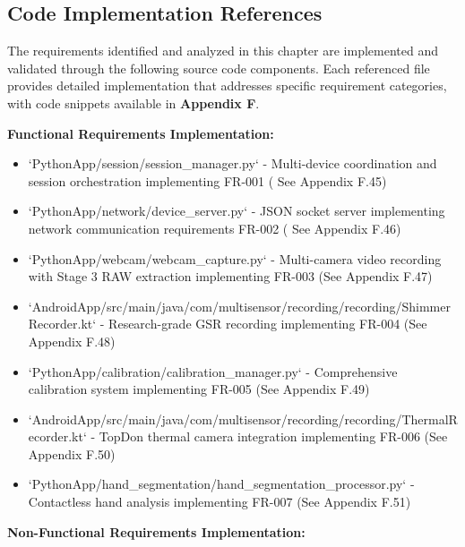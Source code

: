 \documentclass[12pt,a4paper]{report}
\begin{document}
\subsection{Code Implementation References}

The requirements identified and analyzed in this chapter are implemented and validated through the following source code
components. Each referenced file provides detailed implementation that addresses specific requirement categories, with
code snippets available in \textbf{Appendix F}.

\textbf{Functional Requirements Implementation:}

\begin{itemize}
\item `PythonApp/session/session_manager.py` - Multi-device coordination and session orchestration implementing FR-001 (
  See Appendix F.45)
\item `PythonApp/network/device_server.py` - JSON socket server implementing network communication requirements FR-002 (
  See Appendix F.46)
\item `PythonApp/webcam/webcam_capture.py` - Multi-camera video recording with Stage 3 RAW extraction implementing
  FR-003 (See Appendix F.47)
\item `AndroidApp/src/main/java/com/multisensor/recording/recording/ShimmerRecorder.kt` - Research-grade GSR recording
  implementing FR-004 (See Appendix F.48)
\item `PythonApp/calibration/calibration_manager.py` - Comprehensive calibration system implementing FR-005 (See
  Appendix F.49)
\item `AndroidApp/src/main/java/com/multisensor/recording/recording/ThermalRecorder.kt` - TopDon thermal camera integration
  implementing FR-006 (See Appendix F.50)
\item `PythonApp/hand_segmentation/hand_segmentation_processor.py` - Contactless hand analysis implementing FR-007 (See
  Appendix F.51)

\end{itemize}
\textbf{Non-Functional Requirements Implementation:}
\end{document}
